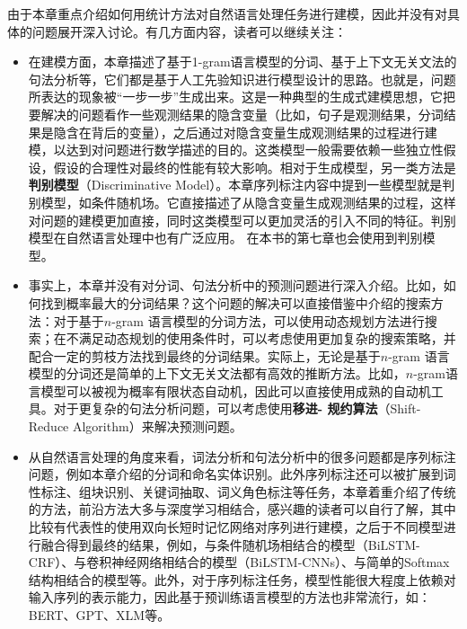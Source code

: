 \parinterval 由于本章重点介绍如何用统计方法对自然语言处理任务进行建模，因此并没有对具体的问题展开深入讨论。有几方面内容，读者可以继续关注：

\begin{itemize}
\vspace{0.5em}
\item 在建模方面，本章描述了基于1-gram语言模型的分词、基于上下文无关文法的句法分析等，它们都是基于人工先验知识进行模型设计的思路。也就是，问题所表达的现象被“一步一步”生成出来。这是一种典型的生成式建模思想，它把要解决的问题看作一些观测结果的隐含变量（比如，句子是观测结果，分词结果是隐含在背后的变量），之后通过对隐含变量生成观测结果的过程进行建模，以达到对问题进行数学描述的目的。这类模型一般需要依赖一些独立性假设，假设的合理性对最终的性能有较大影响。相对于生成模型，另一类方法是{\small\sffamily\bfseries{判别模型}}（Discriminative Model）。本章序列标注内容中提到一些模型就是判别模型，如条件随机场。它直接描述了从隐含变量生成观测结果的过程，这样对问题的建模更加直接，同时这类模型可以更加灵活的引入不同的特征。判别模型在自然语言处理中也有广泛应用。 在本书的第七章也会使用到判别模型。
\vspace{0.5em}
\item 事实上，本章并没有对分词、句法分析中的预测问题进行深入介绍。比如，如何找到概率最大的分词结果？这个问题的解决可以直接借鉴{\chaptertwo}中介绍的搜索方法：对于基于$n$-­gram 语言模型的分词方法，可以使用动态规划方法进行搜索；在不满足动态规划的使用条件时，可以考虑使用更加复杂的搜索策略，并配合一定的剪枝方法找到最终的分词结果。实际上，无论是基于$n$-gram 语言模型的分词还是简单的上下文无关文法都有高效的推断方法。比如，$n$-gram语言模型可以被视为概率有限状态自动机，因此可以直接使用成熟的自动机工具。对于更复杂的句法分析问题，可以考虑使用{\small\sffamily\bfseries{移进- 规约算法}}（Shift-Reduce Algorithm）来解决预测问题。
\vspace{0.5em}
\item 从自然语言处理的角度来看，词法分析和句法分析中的很多问题都是序列标注问题，例如本章介绍的分词和命名实体识别。此外序列标注还可以被扩展到词性标注、组块识别、关键词抽取、词义角色标注等任务，本章着重介绍了传统的方法，前沿方法大多与深度学习相结合，感兴趣的读者可以自行了解，其中比较有代表性的使用双向长短时记忆网络对序列进行建模，之后于不同模型进行融合得到最终的结果，例如，与条件随机场相结合的模型（BiLSTM-CRF）、与卷积神经网络相结合的模型（BiLSTM-CNNs）、与简单的Softmax结构相结合的模型等。此外，对于序列标注任务，模型性能很大程度上依赖对输入序列的表示能力，因此基于预训练语言模型的方法也非常流行，如：BERT、GPT、XLM等。
\vspace{0.5em}
\end{itemize}
